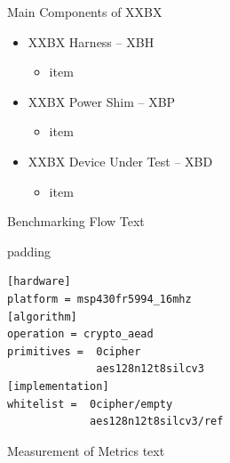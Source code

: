 \documentclass[xcolor=pdftex,dvipsnames,table,final]{beamer}
\begin{document}
\begin{frame}[fragile]{}
\begin{columns}[t, totalwidth=\textwidth]
\begin{column}{.675\linewidth}
\begin{columns}
\begin{column}{.473\linewidth}
\begin{block}{Main Components of XXBX}
\begin{itemize}
          \item XXBX Harness -- XBH 
          \begin{itemize}
            \item item 
          \end{itemize}
          \item XXBX Power Shim -- XBP
          \begin{itemize}
            \item item 
          \end{itemize}
          \item XXBX Device Under Test -- XBD
          \begin{itemize}
            \item item 
          \end{itemize}
        \end{itemize}
      \end{block}
     
      \begin{block}{Benchmarking Flow}
        Text
          \begin{center}
            \begin{minipage}{0.9\linewidth}
            \begin{beamercolorbox}[rounded=true]{padding}%
               \footnotesize%
              \begin{lstlisting}
[hardware]
platform = msp430fr5994_16mhz
[algorithm]
operation = crypto_aead
primitives =  0cipher
              aes128n12t8silcv3
[implementation]
whitelist =  0cipher/empty
             aes128n12t8silcv3/ref
              \end{lstlisting}
            \end{beamercolorbox}
            \end{minipage}%
          \end{center}
      \end{block}
     
      \begin{block}{Measurement of Metrics}
        text
      \end{block}


\end{column}
\end{columns}
\end{column}
\end{columns}
\end{frame}
\end{document}
